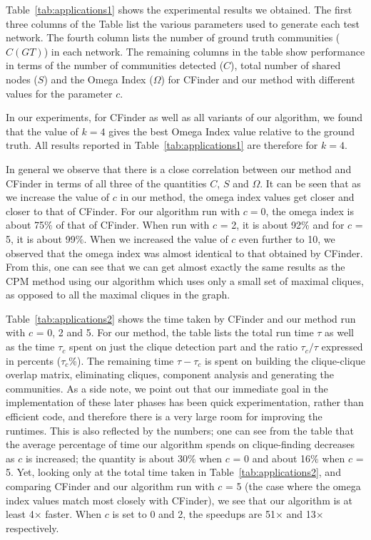 


Table~\ref{tab:applications1} shows the experimental results we obtained.
The first three columns of the Table list the various parameters used to generate each test network. The fourth column lists the number of ground truth communities ($C(GT)$) in each network.  The remaining columns in the table show performance 
in terms of the number of communities detected ($C$), 
total number of shared nodes ($S$) and the Omega Index ($\Omega$) for 
CFinder and our method with different values for the parameter $c$.

In our experiments, for CFinder as well as all variants of our algorithm, 
we found that the value of $k=4$ gives the best Omega Index value relative 
to the ground truth. All results reported in Table~\ref{tab:applications1} are therefore
for $k=4$.

In general we observe that there is a close correlation between our method and CFinder
in terms of all three of the quantities $C$, $S$ and $\Omega$. It can be seen that as we increase the value of $c$ in our method, the omega index values get closer and closer to that of CFinder. For our algorithm run with $c=0$, the omega index is about 75$\%$ of that of CFinder. When run with $c$ = 2, it is about 92$\%$ and for $c$ = 5, it is about 99$\%$. When we increased the value of $c$ even further to 10, we observed that the omega index was almost identical to that obtained by CFinder. From this, one can see that we can get almost exactly the same results as the CPM method using our algorithm which uses only a small set of 
maximal cliques, as opposed to all the maximal cliques in the graph.



Table~\ref{tab:applications2} shows the time taken by CFinder and our method 
run with $c$ = 0, 2 and 5. For our method, the table lists the total run time $\tau$ 
as well as the time $\tau_c$ spent on just the clique detection part and the ratio
${\tau_c}/{\tau}$ expressed in percents ($\tau_c$\%).
The remaining time $\tau - \tau_c$ is spent on building the clique-clique overlap matrix, eliminating cliques, component analysis and generating the communities.  As a side note,
we point out that our immediate goal in the implementation of these later phases has been quick experimentation, rather than efficient code, and therefore there is a very large room for improving the runtimes. This is also reflected by the numbers; one can see from the table that the average percentage of time our algorithm spends on clique-finding decreases as $c$ is increased; the quantity is about 30$\%$ when $c$ = 0 and about 16$\%$ when $c$ = 5. Yet, looking only at the total time taken in Table~\ref{tab:applications2}, and comparing CFinder and our algorithm run with $c$ = 5 (the case where the omega index values match most closely with CFinder), we see that our algorithm is at least 4$\times$ faster. When $c$ is set to 0 and 2, the speedups are 51$\times$ and 13$\times$ respectively. 

